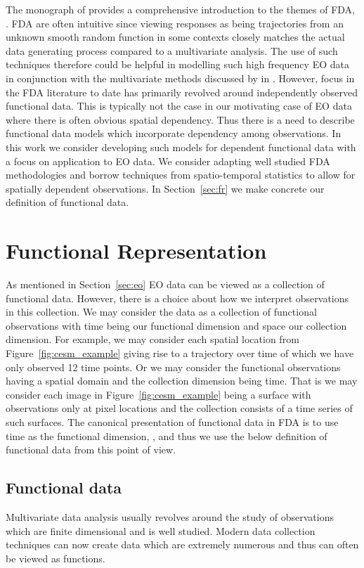 The monograph of \citeauthor{ramsay_functional_2010} provides a comprehensive introduction to the themes of FDA, \citep{ramsay_functional_2010}.
FDA are often intuitive since viewing responses as being trajectories from an unknown smooth random function in some contexts closely matches the actual data generating process compared to a multivariate analysis.
The use of such techniques therefore could be helpful in modelling such high frequency EO data in conjunction with the multivariate methods discussed by \citeauthor{cressie_statistics_2011} in \citep{cressie_statistics_2011}.
However, focus in the FDA literature to date has primarily revolved around independently observed functional data.
This is typically not the case in our motivating case of EO data where there is often obvious spatial dependency.
Thus there is a need to describe functional data models which incorporate dependency among observations.
In this work we consider developing such models for dependent functional data with a focus on application to EO data.
We consider adapting well studied FDA methodologies and borrow techniques from spatio-temporal statistics to allow for spatially dependent observations.
In Section~\ref{sec:fr} we make concrete our definition of functional data. 

\section{Functional Representation \label{sec:fr}}
As mentioned in Section~\ref{sec:eo} EO data can be viewed as a collection of functional data.
However, there is a choice about how we interpret observations in this collection.
We may consider the data as a collection of functional observations with time being our functional dimension and space our collection dimension.
For example, we may consider each spatial location from Figure~\ref{fig:cesm_example} giving rise to a trajectory over time of which we have only observed 12 time points.
Or we may consider the functional observations having a spatial domain and the collection dimension being time.
That is we may consider each image in Figure~\ref{fig:cesm_example} being a surface with observations only at pixel locations and the collection consists of a time series of such surfaces. 
The canonical presentation of functional data in FDA is to use time as the functional dimension, \citep{ramsay_functional_2010}, and thus we use the below definition of functional data from this point of view. 

\subsection{Functional data \label{ssec:fd}}
Multivariate data analysis usually revolves around the study of observations which are finite dimensional and is well studied.
Modern data collection techniques can now create data which are extremely numerous and thus can often be viewed as functions.

